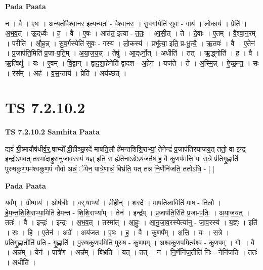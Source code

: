 \documentclass[17pt]{extarticle}
\begin{document}
\textbf{Pada Paata} \newline

न । वै । ए॒षः । अ॒न्यतो॑वैश्वानर॒ इत्य॒न्यतः॑ - वै॒श्वा॒न॒रः॒ । सु॒व॒र्गायेति॑ सुवः - गाय॑ । लो॒काय॑ । प्रेति॑ । अ॒भ॒व॒त् । ऊ॒द्‌र्ध्वः । ह॒ । वै । ए॒षः । आत॑त॒ इत्या - त॒तः॒ । आ॒सी॒त् । ते । दे॒वाः । ए॒तम् । वै॒श्वा॒न॒रम् । परीति॑ । औ॒ह॒न्न् । सु॒व॒र्गस्येति॑ सुवः - गस्य॑ । लो॒कस्य॑ । प्रभू᳚त्या॒ इति॒ प्र-भू॒त्यै॒ । ऋ॒तवः॑ । वै । ए॒तेन॑ । प्र॒जाप॑ति॒मिति॑ प्र॒जा-प॒ति॒म् । अ॒या॒ज॒य॒न्न् । तेषु॑ । आ॒द्‌र्ध्नो॒त् । अधीति॑ । तत् । ऋ॒द्ध्नोति॑ । ह॒ । वै । ऋ॒त्विक्षु॑ । यः । ए॒वम् । वि॒द्वान् । द्वा॒द॒शा॒हेनेति॑ द्वादश - अ॒हेन॑ । यज॑ते । ते । अ॒स्मि॒न्न् । ऐ॒च्छ॒न्त॒ । सः । रस᳚म् । अह॑ । व॒स॒न्ताय॑ । प्रेति॑ । अय॑च्छत् ।  \newline





\section{ TS 7.2.10.2 }

\textbf{TS 7.2.10.2 } \newline
\textbf{Samhita Paata} \newline

द्यवं॑ ग्री॒ष्मायौष॑धीर्व॒र्॒.षाभ्यो᳚ व्री॒हीञ्छ॒रदे॑ माषति॒लौ हे॑मन्तशिशि॒राभ्यां॒ तेनेन्द्रं॑ प्र॒जाप॑तिरयाजय॒त् ततो॒ वा इन्द्र॒ इन्द्रो॑ऽभव॒त् तस्मा॑दाहुरानुजाव॒रस्य॑ य॒ज्ञ् इति॒ स ह्ये॑तेनाऽग्रेऽय॑जतै॒ष ह॒ वै कु॒णप॑मत्ति॒ यः स॒त्रे प्र॑तिगृ॒ह्णाति॑ पुरुषकुण॒पम॑श्वकुण॒पं गौर्वा अन्नं॒ ॅयेन॒ पात्रे॒णान्नं॒ बिभ्र॑ति॒ यत् तन्न नि॒र्णेनि॑जति॒ ततोऽधि॒ - [  ] \newline

\textbf{Pada Paata} \newline

यव᳚म् । ग्री॒ष्माय॑ । ओष॑धीः । व॒र्॒.षाभ्यः॑ । व्री॒हीन् । श॒रदे᳚ । मा॒ष॒ति॒लाविति॑ माष - ति॒लौ । हे॒म॒न्त॒शि॒शि॒राभ्या॒मिति॑ हेमन्त - शि॒शि॒राभ्या᳚म् । तेन॑ । इन्द्र᳚म् । प्र॒जाप॑ति॒रिति॑ प्र॒जा-प॒तिः॒ । अ॒या॒ज॒य॒त् । ततः॑ । वै । इन्द्रः॑ । इन्द्रः॑ । अ॒भ॒व॒त् । तस्मा᳚त् । आ॒हुः॒ । आ॒नु॒जा॒व॒रस्येत्या॑नु - जा॒व॒रस्य॑ । य॒ज्ञ्ः । इति॑ । सः । हि । ए॒तेन॑ । अग्रे᳚ । अय॑जत । ए॒षः । ह॒ । वै । कु॒णप᳚म् । अ॒त्ति॒ । यः । स॒त्रे । प्र॒ति॒गृ॒ह्णातीति॑ प्रति - गृ॒ह्णाति॑ । पु॒रु॒ष॒कु॒ण॒पमिति॑ पुरुष - कु॒ण॒पम् । अ॒श्व॒कु॒ण॒पमित्य॑श्व - कु॒ण॒पम् । गौः । वै । अन्न᳚म् । येन॑ । पात्रे॑ण । अन्न᳚म् । बिभ्र॑ति । यत् । तत् । न । नि॒र्णेनि॑ज॒तीति॑ निः - नेनि॑जति । ततः॑ । अधीति॑ ।  \newline
\end{document}
